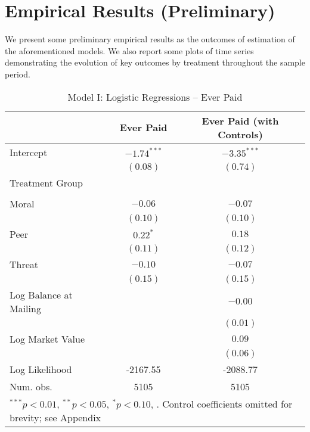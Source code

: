 \documentclass[12pt,titlepage]{article}
\begin{document}
\section{Empirical Results (Preliminary) }

We present some preliminary empirical results as the outcomes of
estimation of the aforementioned models. We also report some plots of time series
demonstrating the evolution of key outcomes by treatment throughout the sample
period.


\begin{table}[htbp]
\caption{Model I: Logistic Regressions -- Ever Paid} \label{table:modelI}
\begin{center}
\begin{tabular}{l c c }
\hline
                       & Ever Paid & Ever Paid (with Controls) \\
\hline
Intercept              & $-1.74^{***}$ & $-3.35^{***}$ \\
                       & $(0.08)$      & $(0.74)$      \\
Treatment Group        &               &               \\
                       &               &               \\
\quad Moral            & $-0.06$       & $-0.07$       \\
                       & $(0.10)$      & $(0.10)$      \\
\quad Peer             & $0.22^{*}$        & $0.18$        \\
                       & $(0.11)$      & $(0.12)$      \\
\quad Threat           & $-0.10$       & $-0.07$       \\
                       & $(0.15)$      & $(0.15)$      \\
Log Balance at Mailing &               & $-0.00$       \\
                       &               & $(0.01)$      \\
Log Market Value       &               & $0.09$        \\
                       &               & $(0.06)$      \\
\hline
Log Likelihood         & -2167.55      & -2088.77      \\
Num. obs.              & 5105          & 5105          \\
\hline
\multicolumn{3}{l}{\scriptsize{$^{***}p<0.01$, $^{**}p<0.05$, $^*p<0.10$, . Control coefficients omitted for brevity; see Appendix}}
\end{tabular}
\end{center}
\end{table}
\end{document}
